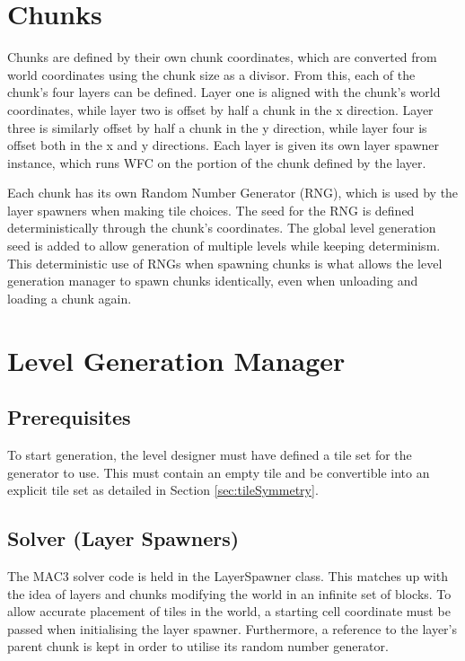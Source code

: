 
\section{Chunks}
Chunks are defined by their own chunk coordinates, which are converted from world coordinates using the chunk size as a divisor. From this, each of the chunk's four layers can be defined. Layer one is aligned with the chunk's world coordinates, while layer two is offset by half a chunk in the x direction. Layer three is similarly offset by half a chunk in the y direction, while layer four is offset both in the x and y directions. Each layer is given its own layer spawner instance, which runs WFC on the portion of the chunk defined by the layer.


Each chunk has its own Random Number Generator (RNG), which is used by the layer spawners when making tile choices. The seed for the RNG is defined deterministically through the chunk's coordinates. The global level generation seed is added to allow generation of multiple levels while keeping determinism. This deterministic use of RNGs when spawning chunks is what allows the level generation manager to spawn chunks identically, even when unloading and loading a chunk again.

\section{Level Generation Manager}
\subsection{Prerequisites}
To start generation, the level designer must have defined a tile set for the generator to use. This must contain an empty tile and be convertible into an explicit tile set as detailed in Section \ref{sec:tileSymmetry}.

\subsection{Solver (Layer Spawners)}
The MAC3 solver code is held in the LayerSpawner class. This matches up with the idea of layers and chunks modifying the world in an infinite set of blocks. To allow accurate placement of tiles in the world, a starting cell coordinate must be passed when initialising the layer spawner. Furthermore, a reference to the layer's parent chunk is kept in order to utilise its random number generator.

